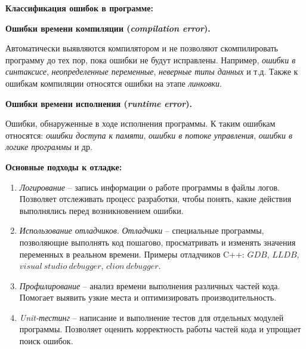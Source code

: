 {\centering \textbf{Классификация ошибок в программе:}}\\
\begin{minipage}[t]{0.45\textwidth}
	\begin{center} \textbf{Ошибки времени компиляции (\textit{compilation error}).} \end{center}
	Автоматически выявляются компилятором и не позволяют скомпилировать программу до тех пор, пока ошибки не будут исправлены. Например, \textit{ошибки в синтаксисе}, \textit{неопределенные переменные}, \textit{неверные типы данных} и т.д. Также к ошибкам компиляции относятся ошибки на этапе \textit{линковки}.
\end{minipage}
\hspace{1cm}
\begin{minipage}[t]{0.45\textwidth}
	\begin{center} \textbf{Ошибки времени исполнения (\textit{runtime error}).} \end{center}
	Ошибки, обнаруженные в ходе исполнения программы. К таким ошибкам относятся: \textit{ошибки доступа к памяти}, \textit{ошибки в потоке управления}, \textit{ошибки в логике программы} и др.
\end{minipage}
\vspace{5pt}

\textbf{Основные подходы к отладке:}\par
\begin{enumerate}[font=\footnotesize, noitemsep, topsep=0pt, , partopsep=0pt]
	\item \textit{Логирование} -- запись‍ информации о работе  программы в файлы логов. Позволяет отслеживать процесс разработки, чтобы понять, какие ‌действия выполнялись перед возникновением ошибки.
	\item \textit{Использование отладчиков}. \textit{Отладчики} -- специальные программы, позволяющие выполнять код пошагово, просматривать и изменять значения переменных ​в реальном времени. Примеры отладчиков C++: $GDB$, $LLDB$, $visual \ studio \ debugger$, $clion \ debugger$.
	\item \textit{Профилирование} -- анализ времени выполнения различных частей кода. Помогает выявить узкие места и оптимизировать производительность.
	\item \textit{Unit-тестинг} -- написание‌ и выполнение тестов для отдельных модулей программы. Позволяет оценить корректность работы частей кода и упрощает поиск ошибок.
\end{enumerate}
\vspace{10pt}

